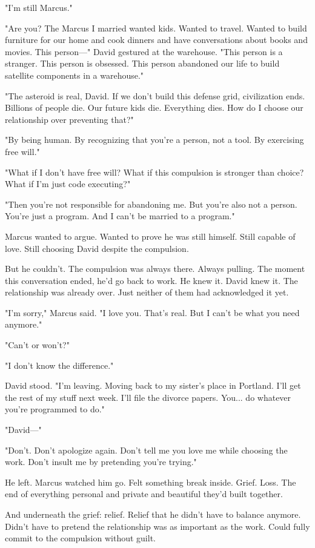"I'm still Marcus."

"Are you? The Marcus I married wanted kids. Wanted to travel. Wanted to build furniture for our home and cook dinners and have conversations about books and movies. This person—" David gestured at the warehouse. "This person is a stranger. This person is obsessed. This person abandoned our life to build satellite components in a warehouse."

"The asteroid is real, David. If we don't build this defense grid, civilization ends. Billions of people die. Our future kids die. Everything dies. How do I choose our relationship over preventing that?"

"By being human. By recognizing that you're a person, not a tool. By exercising free will."

"What if I don't have free will? What if this compulsion is stronger than choice? What if I'm just code executing?"

"Then you're not responsible for abandoning me. But you're also not a person. You're just a program. And I can't be married to a program."

Marcus wanted to argue. Wanted to prove he was still himself. Still capable of love. Still choosing David despite the compulsion.

But he couldn't. The compulsion was always there. Always pulling. The moment this conversation ended, he'd go back to work. He knew it. David knew it. The relationship was already over. Just neither of them had acknowledged it yet.

"I'm sorry," Marcus said. "I love you. That's real. But I can't be what you need anymore."

"Can't or won't?"

"I don't know the difference."

David stood. "I'm leaving. Moving back to my sister's place in Portland. I'll get the rest of my stuff next week. I'll file the divorce papers. You... do whatever you're programmed to do."

"David—"

"Don't. Don't apologize again. Don't tell me you love me while choosing the work. Don't insult me by pretending you're trying."

He left. Marcus watched him go. Felt something break inside. Grief. Loss. The end of everything personal and private and beautiful they'd built together.

And underneath the grief: relief. Relief that he didn't have to balance anymore. Didn't have to pretend the relationship was as important as the work. Could fully commit to the compulsion without guilt.

